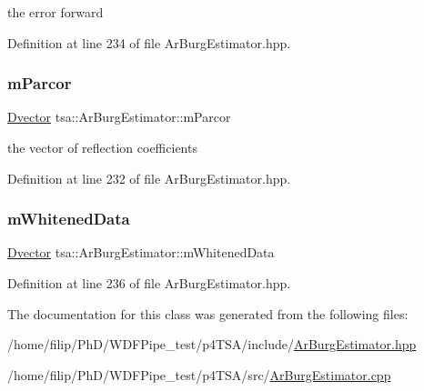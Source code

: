 the error forward 

Definition at line 234 of file Ar\+Burg\+Estimator.\+hpp.

\mbox{\label{classtsa_1_1_ar_burg_estimator_a51cbda2be55098f65e4d710cfe1153b7}} 
\subsubsection{\texorpdfstring{m\+Parcor}{mParcor}}
{\footnotesize\ttfamily \hyperlink{namespacetsa_a8900fb03d849baf447a1a0efe2561fb2}{Dvector} tsa\+::\+Ar\+Burg\+Estimator\+::m\+Parcor\hspace{0.3cm}{\ttfamily [private]}}

the vector of reflection coefficients 

Definition at line 232 of file Ar\+Burg\+Estimator.\+hpp.

\mbox{\label{classtsa_1_1_ar_burg_estimator_a3d033517e7242d079e14038dcd50556c}} 
\subsubsection{\texorpdfstring{m\+Whitened\+Data}{mWhitenedData}}
{\footnotesize\ttfamily \hyperlink{namespacetsa_a8900fb03d849baf447a1a0efe2561fb2}{Dvector} tsa\+::\+Ar\+Burg\+Estimator\+::m\+Whitened\+Data\hspace{0.3cm}{\ttfamily [private]}}



Definition at line 236 of file Ar\+Burg\+Estimator.\+hpp.



The documentation for this class was generated from the following files\+:\begin{DoxyCompactItemize}
\item 
/home/filip/\+Ph\+D/\+W\+D\+F\+Pipe\+\_\+test/p4\+T\+S\+A/include/\hyperlink{_ar_burg_estimator_8hpp}{Ar\+Burg\+Estimator.\+hpp}\item 
/home/filip/\+Ph\+D/\+W\+D\+F\+Pipe\+\_\+test/p4\+T\+S\+A/src/\hyperlink{_ar_burg_estimator_8cpp}{Ar\+Burg\+Estimator.\+cpp}\end{DoxyCompactItemize}
